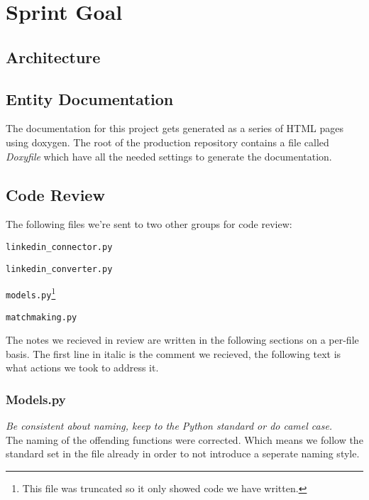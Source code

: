 \section{Sprint Goal}


\subsection{Architecture}


\subsection{Entity Documentation}
The documentation for this project gets generated as a series of HTML pages using doxygen. The root of the production repository contains a file called \textit{Doxyfile} which have all the needed settings to generate the documentation.


\subsection{Code Review}
The following files we're sent to two other groups for code review:
\begin{itemize*}
    \item \texttt{linkedin\_connector.py}
    \item \texttt{linkedin\_converter.py}
    \item \texttt{models.py}\footnote{This file was truncated so it only showed code we have written.}
    \item \texttt{matchmaking.py}
\end{itemize*}

The notes we recieved in review are written in the following sections on a per-file basis.
The first line in italic is the comment we recieved, the following text is what actions we took to address it.

\subsubsection{Models.py}
\begin{itemize*}
    \item \textit{Be consistent about naming, keep to the Python standard or do camel case.}\\
          The naming of the offending functions were corrected. Which means we follow the standard set in the file already in order to not introduce a seperate naming style.
\end{itemize*}


